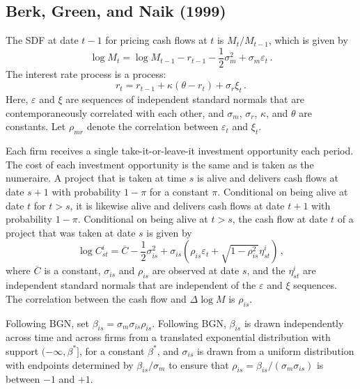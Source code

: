 \documentclass[12pt]{scrarticle}
\begin{document}
\clearpage
\appendixpage
\begin{appendices}

\section{Berk, Green, and Naik (1999)}


The SDF at date $t-1$ for pricing cash flows at $t$ is $M_t/M_{t-1}$, which is given by
\begin{equation}\label{logsdf}
\log M_{t} = \log M_{t-1} - r_{t-1} - \frac{1}{2}\sigma_m^2 + \sigma_m \varepsilon_{t}\,.
\end{equation}
The interest rate process is a \cite{vasicek} process:
\begin{equation}\label{interestrate}
r_{t} = r_{t-1} + \kappa(\theta - r_t) + \sigma_r \xi_{t}\,.
\end{equation}
Here, $\varepsilon$ and $\xi$ are sequences of independent standard normals that are contemporaneously correlated with each other, and $\sigma_m$, $\sigma_r$, $\kappa$, and $\theta$ are constants.  Let $\rho_{mr}$ denote the correlation between $\varepsilon_t$ and $\xi_t$.

Each firm receives a single take-it-or-leave-it investment opportunity each period.  The cost of each investment opportunity is the same and is taken as the numeraire.  A project that is taken at time $s$ is alive and delivers cash flows at date $s+1$ with probability $1-\pi$ for a constant $\pi$.  Conditional on being alive at date $t$ for $t>s$, it is likewise alive and delivers cash flows at date $t+1$ with probability $1-\pi$.  Conditional on being alive at $t>s$, the cash flow at date $t$ of a project that was taken at date $s$ is given by
\begin{equation}\label{cashflow}
\log C_{st}^i = \overline{C} - \frac{1}{2} \sigma_{is}^2 +  \sigma_{is} \left(\rho_{is} \varepsilon_{t} + \sqrt{1 - \rho_{is}^2} \eta_{st}^i\right)\,,
\end{equation}
where $\overline{C}$ is a constant, $\sigma_{is}$ and $\rho_{is}$ are observed at date $s$, and the $\eta_{st}^i$ are independent standard normals that are independent of the $\varepsilon$ and $\xi$ sequences.  The correlation between the cash flow and  $\Delta \log M$ is $\rho_{is}$.  

Following BGN, set $\beta_{is} = \sigma_m\sigma_{is}\rho_{is}$.   Following BGN, $\beta_{is}$ is drawn independently across time and across firms from a translated exponential distribution with support $(-\infty, \beta^*]$, for a constant $\beta^*$, and $\sigma_{is}$ is drawn from a uniform distribution with endpoints determined by $\beta_{is}/\sigma_m$ to ensure that $\rho_{is} = \beta_{is}/(\sigma_m\sigma_{is})$ is between $-1$ and $+1$.


\end{appendices}
\end{document}
